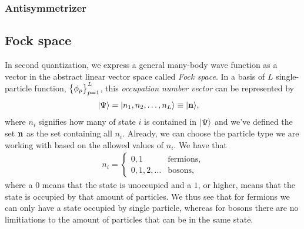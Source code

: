             \subsubsection{Antisymmetrizer}


        \subsection{Fock space}
            In second quantization, we express a general many-body wave function
            as a vector in the abstract linear vector space called \emph{Fock
            space}.
            In a basis of $L$ single-particle function, $\left\{ \phi_p \right\}_{p =
            1}^{L}$, this \emph{occupation number vector} can be represented by
            \begin{align}
                | \Psi \rangle
                &= | n_1, n_2, \dots, n_L \rangle
                \equiv | \mathbf{n} \rangle,
            \end{align}
            where $n_i$ signifies how many of state $i$ is contained in
            $| \Psi \rangle$ and we've defined the set $\mathbf{n}$ as the set
            containing all $n_i$.
            Already, we can choose the particle type we are working with based
            on the allowed values of $n_i$.
            We have that
            \begin{align}
                n_i =
                \begin{cases}
                    0, 1 & \text{fermions}, \\
                    0, 1, 2, \dots & \text{bosons},
                \end{cases}
            \end{align}
            where a $0$ means that the state is unoccupied and a $1$, or higher,
            means that the state is occupied by that amount of particles.
            We thus see that for fermions we can only have a state occupied by
            single particle, whereas for bosons there are no limitiations to the
            amount of particles that can be in the same state.

